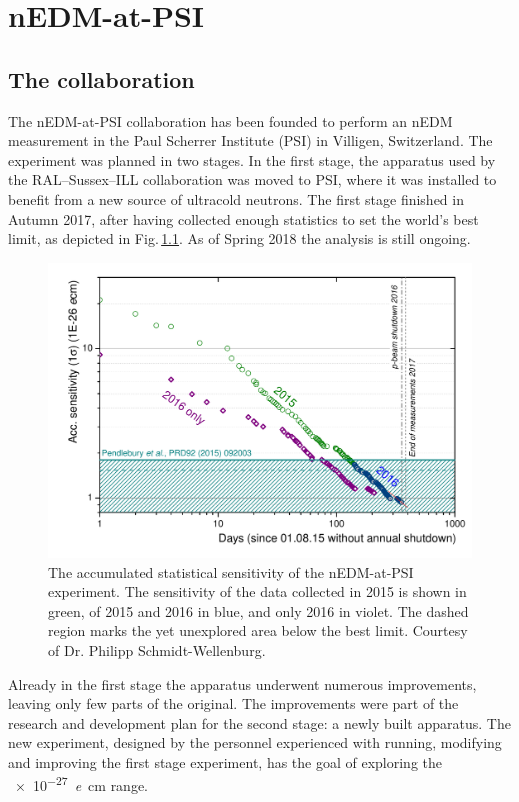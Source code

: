 \chapter{nEDM-at-PSI}
\label{ch:nedm-at-psi-apparatus}

\section{The collaboration}
The nEDM-at-PSI collaboration  has been founded to perform an nEDM measurement in the Paul Scherrer Institute (PSI) in Villigen, Switzerland. The experiment was planned in two stages. In the first stage, the apparatus used by the RAL--Sussex--ILL collaboration was moved to PSI, where it was installed to benefit from a new source of ultracold neutrons. The first stage finished in Autumn 2017, after having collected enough statistics to set the world's best limit, as depicted in Fig.\,\ref{fig:nEDM_accumulated_sensitivity}. As of Spring 2018 the analysis is still ongoing.

\begin{figure}
  \centering
  \includegraphics[width=\linewidth]{gfx/nEDMatPSI/accumulated_sensitivity.pdf}
  \caption{The accumulated statistical sensitivity of the nEDM-at-PSI experiment. The sensitivity of the data collected in 2015 is shown in green, of 2015 and 2016 in blue, and only 2016 in violet. The dashed region marks the yet unexplored area below the best limit. Courtesy of Dr. Philipp Schmidt-Wellenburg.}
  \label{fig:nEDM_accumulated_sensitivity}
\end{figure}

Already in the first stage the apparatus underwent numerous improvements, leaving only few parts of the original. The improvements were part of the research and development plan for the second stage: a newly built apparatus. The new experiment, designed by the personnel experienced with running, modifying and improving the first stage experiment, has the goal of exploring the \SI{e-27}{\elementarycharge\centi\meter} range.



